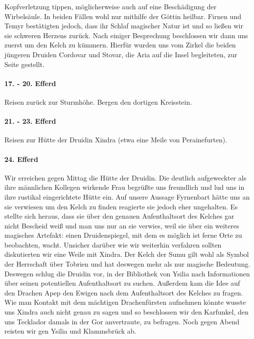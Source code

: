 Kopfverletzung tippen, möglicherweise auch auf eine Beschädigung der Wirbelsäule. In beiden Fällen wohl nur mithilfe der Göttin heilbar. Firnen und Temyr bestätigten jedoch, dass ihr Schlaf magischer Natur ist und so ließen wir sie schweren Herzens zurück. Nach einiger Besprechung beschlossen wir dann uns zuerst um den Kelch zu kümmern. Hierfür wurden uns vom Zirkel die beiden jüngeren Druiden Cordovar und Stovar, die Aria auf die Insel begleiteten, zur Seite gestellt.

\paragraph{17. - 20. Efferd}
Reisen zurück zur Sturmhöhe. Bergen den dortigen Kreisstein.

\paragraph{21. - 23. Efferd}
Reisen zur Hütte der Druidin Xindra (etwa eine Meile von Perainefurten).

\paragraph{24. Efferd}
Wir erreichen gegen Mittag die Hütte der Druidin. Die deutlich aufgeweckter als ihre männlichen Kollegen wirkende Frau begrüßte uns freundlich und lud uns in ihre rustikal eingerichtete Hütte ein. Auf unsere Aussage Fyrnenbart hätte uns an sie verwiesen um den Kelch zu finden reagierte sie jedoch eher ungehalten. Es stellte sich heraus, dass sie über den genauen Aufenthaltsort des Kelches gar nicht Bescheid weiß und man uns nur an sie verwies, weil sie über ein weiteres magisches Artefakt: einen Druidenspiegel, mit dem es möglich ist ferne Orte zu beobachten, wacht. Unsicher darüber wie wir weiterhin verfahren sollten diskutierten wir eine Weile mit Xindra. Der Kelch der Sumu gilt wohl als Symbol der Herrschaft über Tobrien und hat deswegen mehr als nur magische Bedeutung. Deswegen schlug die Druidin vor, in der Bibliothek von Ysilia nach Informationen über seinen potentiellen Aufenthaltsort zu suchen. Außerdem kam die Idee auf den Drachen Apep den Ewigen nach dem Aufenthaltsort des Kelches zu fragen. Wie man Kontakt mit dem mächtigen Drachenfürsten aufnehmen könnte wusste uns Xindra auch nicht genau zu sagen und so beschlossen wir den Karfunkel, den uns Tecklador damals in der Gor anvertraute, zu befragen. Noch gegen Abend reisten wir gen Ysilia und Klammsbrück ab.

